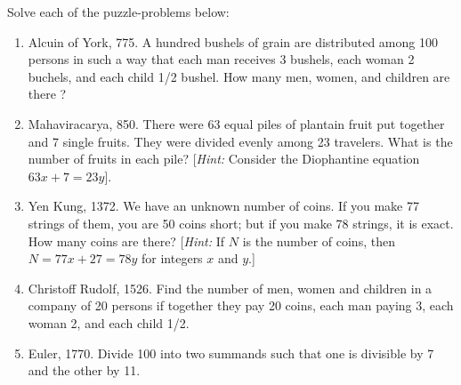\begin{exercise}
    Solve each of the puzzle-problems below:
    \begin{enumerate}
        \item Alcuin of York, 775. A hundred bushels of grain are distributed among 100 persons in such a way that each man receives 3 bushels, each woman 2 buchels, and each child 1/2 bushel. How many men, women, and children are there ?
        \item Mahaviracarya, 850. There were 63 equal piles of plantain fruit put together and 7 single fruits. They were divided evenly among 23 travelers. What is the number of fruits in each pile? [\textit{Hint:} Consider the Diophantine equation $63x + 7 = 23y$].
        \item Yen Kung, 1372. We have an unknown number of coins. If you make 77 strings of them, you are 50 coins short; but if you make 78 strings, it is exact. How many coins are there? [\textit{Hint:} If $N$ is the number of coins, then $N = 77x + 27 = 78y$ for integers $x$ and $y$.]
        \item Christoff Rudolf, 1526. Find the number of men, women and children in a company of 20 persons if together they pay 20 coins, each man paying 3, each woman 2, and each child 1/2.
        \item Euler, 1770. Divide 100 into two summands such that one is divisible by 7 and the other by 11.
    \end{enumerate}
\end{exercise}

